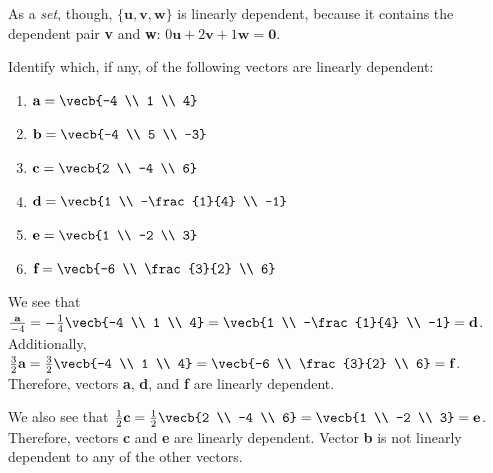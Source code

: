 As a \emph{set}, though, $\{\textbf{u}, \textbf{v}, \textbf{w}\}$ is
linearly dependent, because it contains the dependent pair \textbf{v} and
\textbf{w}: $0\textbf{u} + 2\textbf{v} + 1\textbf{w} = \mathbf{0}$.

\begin{Exercise}[title = Linear Dependence, label = colinear]
Identify which, if any, of the following vectors are linearly dependent:
\begin{enumerate}
\item $\textbf{a} = \vecb{-4 \\ 1 \\ 4}$
\item $\textbf{b} = \vecb{-4 \\ 5 \\ -3}$
\item $\textbf{c} = \vecb{2 \\ -4 \\ 6}$
\item $\textbf{d} = \vecb{1 \\ -\frac{1}{4} \\ -1}$
\item $\textbf{e} = \vecb{1 \\ -2 \\ 3}$
\item $\textbf{f} = \vecb{-6 \\ \frac{3}{2} \\ 6}$
\end{enumerate}
\end{Exercise}

\begin{Answer}[ref = colinear]
We see that $\frac{\textbf{a}}{-4} = -\frac{1}{4} \vecb{-4 \\ 1 \\ 4} = 
\vecb{1 \\ -\frac{1}{4} \\ -1} = \textbf{d}$. Additionally, $\frac{3}{2} 
\textbf{a} = \frac{3}{2} \vecb{-4 \\ 1 \\ 4} = \vecb{-6 \\ \frac{3}{2} \\ 6} 
= \textbf{f}$. Therefore, vectors \textbf{a}, \textbf{d}, and \textbf{f} 
are linearly dependent. 

We also see that $\frac{1}{2} \textbf{c} = \frac{1}{2} \vecb{2 \\ -4 \\ 6} 
= \vecb{1 \\ -2 \\ 3} = \textbf{e}$. Therefore, vectors \textbf{c} and 
\textbf{e} are linearly dependent. Vector \textbf{b} is not linearly dependent 
to any of the other vectors. 
\end{Answer}
